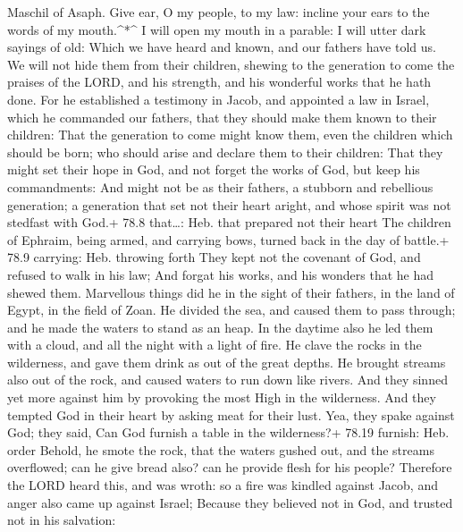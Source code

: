 Maschil of Asaph.  Give ear, O my people, to my law: incline
your ears to the words of my mouth.\^{}*\^{}  I will open my
mouth in a parable: I will utter dark sayings of old:  Which
we have heard and known, and our fathers have told us.  We
will not hide them from their children, shewing to the generation to
come the praises of the LORD, and his strength, and his wonderful works
that he hath done.  For he established a testimony in Jacob,
and appointed a law in Israel, which he commanded our fathers, that they
should make them known to their children:  That the
generation to come might know them, even the children which should be
born; who should arise and declare them to their children: 
That they might set their hope in God, and not forget the works of God,
but keep his commandments:  And might not be as their
fathers, a stubborn and rebellious generation; a generation that set not
their heart aright, and whose spirit was not stedfast with God.+ 78.8
that\ldots: Heb. that prepared not their heart  The children
of Ephraim, being armed, and carrying bows, turned back in the day of
battle.+ 78.9 carrying: Heb. throwing forth  They kept not
the covenant of God, and refused to walk in his law;  And
forgat his works, and his wonders that he had shewed them. 
Marvellous things did he in the sight of their fathers, in the land of
Egypt, in the field of Zoan.  He divided the sea, and
caused them to pass through; and he made the waters to stand as an heap.
 In the daytime also he led them with a cloud, and all the
night with a light of fire.  He clave the rocks in the
wilderness, and gave them drink as out of the great depths.
 He brought streams also out of the rock, and caused waters
to run down like rivers.  And they sinned yet more against
him by provoking the most High in the wilderness.  And they
tempted God in their heart by asking meat for their lust. 
Yea, they spake against God; they said, Can God furnish a table in the
wilderness?+ 78.19 furnish: Heb. order  Behold, he smote
the rock, that the waters gushed out, and the streams overflowed; can he
give bread also? can he provide flesh for his people? 
Therefore the LORD heard this, and was wroth: so a fire was kindled
against Jacob, and anger also came up against Israel; 
Because they believed not in God, and trusted not in his salvation:
